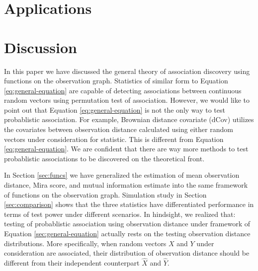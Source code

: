 \documentclass{sig-alternate}
\begin{document}
\section{Applications}
\label{sec:haha}


\section{Discussion}
\label{sec:discussion}

In this paper we have discussed the general theory of association
discovery using functions on the observation graph. Statistics of
similar form to Equation \ref{eq:general-equation} are capable of
detecting associations between continuous random vectors using
permutation test of association. However, we would like to point out
that Equation \ref{eq:general-equation} is not the only way to test
probablistic association. For example, Brownian distance covariate
(dCov) utilizes the covariates between observation distance calculated
using either random vectors under consideration for statistic. This is
different from Equation \ref{eq:general-equation}. We are confident
that there are way more methods to test probablistic associations to
be discovered on the theoretical front.

In Section \ref{sec:funcs} we have generalized the estimation of mean
observation distance, Mira score, and mutual information estimate into
the same framework of functions on the observation graph. Simulation
study in Section \ref{sec:comparison} shows that the three statistics
have differentiated performance in terms of test power under different
scenarios. In hindsight, we realized that: testing of probablistic
association using observation distance under framework of Equation
\ref{sec:general-equation} actually rests on the testing observation
distance distributions. More specifically, when random vectors $X$ and
$Y$ under consideration are associated, their distribution of
observation distance should be different from their independent
counterpart $\hat{X}$ and $\hat{Y}$. 
\end{document}
